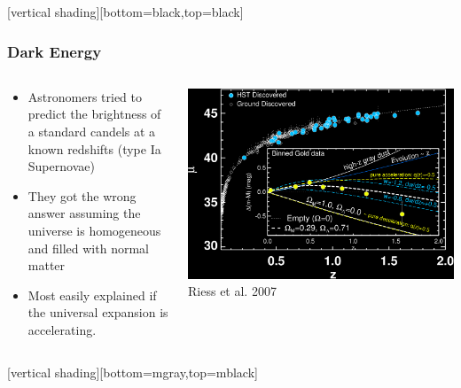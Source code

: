 \documentclass{beamer}
\begin{document}
{
    [vertical shading][bottom=black,top=black]

    \frame
    {
        \frametitle{Dark Energy}

        \begin{columns}
            \begin{column}{0.4\textwidth}    
                \begin{itemize}

                    \item Astronomers tried to predict the brightness of a
                        standard candels at a known redshifts (type Ia
                        Supernovae)

                    \item They got the wrong answer assuming the universe is
                        homogeneous and filled with normal matter

                    \item Most easily explained if the universal expansion is accelerating.

                \end{itemize}
            \end{column}
            \begin{column}{0.6\textwidth}
                \begin{center}
                    \includegraphics[width=\textwidth]{riess-distmodulus.png}
                    \newline
                    {\tiny Riess et al. 2007}
                \end{center}
            \end{column}
        \end{columns}
    }

    [vertical shading][bottom=mgray,top=mblack]
}
\end{document}
